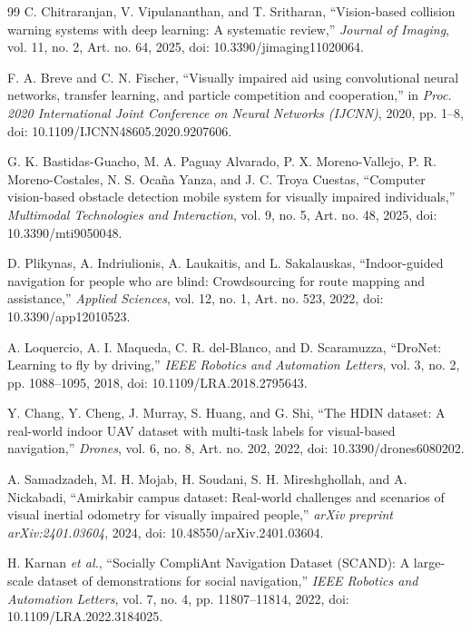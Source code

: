 \documentclass[conference]{IEEEtran}
\begin{document}
\begin{thebibliography}{99}
C. Chitraranjan, V. Vipulananthan, and T. Sritharan,
``Vision-based collision warning systems with deep learning:
A systematic review,''
\emph{Journal of Imaging}, vol. 11, no. 2, Art. no. 64, 2025,
doi: 10.3390/jimaging11020064.

F. A. Breve and C. N. Fischer,
``Visually impaired aid using convolutional neural networks,
transfer learning, and particle competition and cooperation,''
in \emph{Proc. 2020 International Joint Conference on Neural
Networks (IJCNN)}, 2020, pp. 1--8,
doi: 10.1109/IJCNN48605.2020.9207606.

G. K. Bastidas-Guacho, M. A. Paguay Alvarado,
P. X. Moreno-Vallejo, P. R. Moreno-Costales,
N. S. Ocaña Yanza, and J. C. Troya Cuestas,
``Computer vision-based obstacle detection mobile system for
visually impaired individuals,''
\emph{Multimodal Technologies and Interaction},
vol. 9, no. 5, Art. no. 48, 2025,
doi: 10.3390/mti9050048.

D. Plikynas, A. Indriulionis, A. Laukaitis, and
L. Sakalauskas,
``Indoor-guided navigation for people who are blind:
Crowdsourcing for route mapping and assistance,''
\emph{Applied Sciences}, vol. 12, no. 1, Art. no. 523, 2022,
doi: 10.3390/app12010523.

A. Loquercio, A. I. Maqueda, C. R. del-Blanco, and
D. Scaramuzza,
``DroNet: Learning to fly by driving,''
\emph{IEEE Robotics and Automation Letters},
vol. 3, no. 2, pp. 1088--1095, 2018,
doi: 10.1109/LRA.2018.2795643.

Y. Chang, Y. Cheng, J. Murray, S. Huang, and G. Shi,
``The HDIN dataset: A real-world indoor UAV dataset with
multi-task labels for visual-based navigation,''
\emph{Drones}, vol. 6, no. 8, Art. no. 202, 2022,
doi: 10.3390/drones6080202.

A. Samadzadeh, M. H. Mojab, H. Soudani,
S. H. Mireshghollah, and A. Nickabadi,
``Amirkabir campus dataset: Real-world challenges and scenarios
of visual inertial odometry for visually impaired people,''
\emph{arXiv preprint arXiv:2401.03604}, 2024,
doi: 10.48550/arXiv.2401.03604.

H. Karnan \emph{et al.},
``Socially CompliAnt Navigation Dataset (SCAND):
A large-scale dataset of demonstrations for social navigation,''
\emph{IEEE Robotics and Automation Letters},
vol. 7, no. 4, pp. 11807--11814, 2022,
doi: 10.1109/LRA.2022.3184025.


\end{thebibliography}
\end{document}
